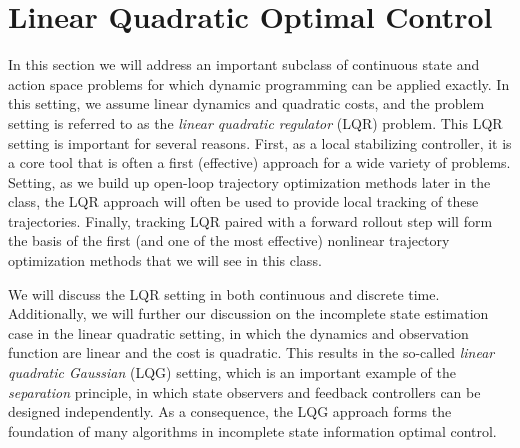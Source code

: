\chapter{Linear Quadratic Optimal Control}


In this section we will address an important subclass of continuous state and action space problems for which dynamic programming can be applied exactly. In this setting, we assume linear dynamics and quadratic costs, and the problem setting is referred to as the \textit{linear quadratic regulator} (LQR) problem. This LQR setting is important for several reasons. First, as a local stabilizing controller, it is a core tool that is often a first (effective) approach for a wide variety of problems. Setting, as we build up open-loop trajectory optimization methods later in the class, the LQR approach will often be used to provide local tracking of these trajectories. Finally, tracking LQR paired with a forward rollout step will form the basis of the first (and one of the most effective) nonlinear trajectory optimization methods that we will see in this class.

We will discuss the LQR setting in both continuous and discrete time. Additionally, we will further our discussion on the incomplete state estimation case in the linear quadratic setting, in which the dynamics and observation function are linear and the cost is quadratic. This results in the so-called \textit{linear quadratic Gaussian} (LQG) setting, which is an important example of the \textit{separation} principle, in which state observers and feedback controllers can be designed independently. As a consequence, the LQG approach forms the foundation of many algorithms in incomplete state information optimal control. 


